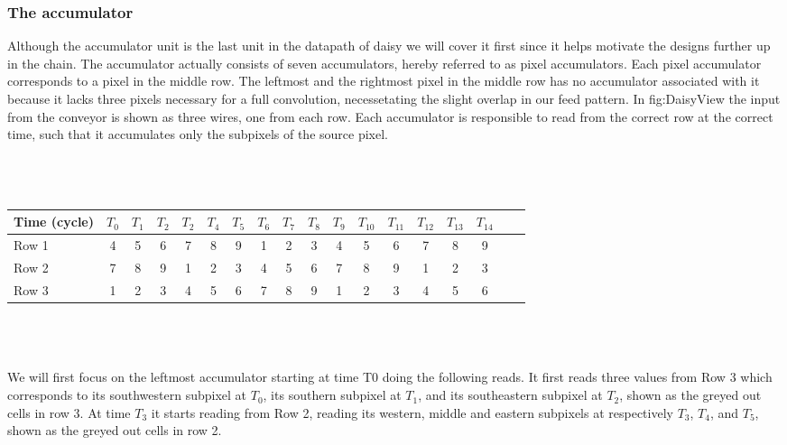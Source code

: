 \subsubsection{The accumulator}
Although the accumulator unit is the last unit in the datapath of daisy we will cover it first since it helps motivate the designs further up in the chain.
The accumulator actually consists of seven accumulators, hereby referred to as pixel accumulators. Each pixel accumulator corresponds to a pixel in the middle row.
The leftmost and the rightmost pixel in the middle row has no accumulator associated with it because it lacks three pixels necessary for a full convolution, necessetating the slight overlap in our feed pattern.
In fig:DaisyView the input from the conveyor is shown as three wires, one from each row.  
Each accumulator is responsible to read from the correct row at the correct time, such that it accumulates only the subpixels of the source pixel.\\ \\ \\
\\
\begin{tabular}{l*{16}{c}r}
    Time (cycle)        & $T_{0}$ & $T_{1}$ & $T_{2}$ & $T_{2}$ & $T_{4}$  & $T_{5}$ & $T_{6}$ & $T_{7}$ & $T_{8}$ & $T_{9}$ & $T_{10}$ & $T_{11}$ & $T_{12}$ & $T_{13}$ & $T_{14}$\\
\hline
Row 1                   & 4 & 5 & 6 & 7 & 8 & 9 & \cellcolor{gray75} 1 & \cellcolor{gray75} 2 & \cellcolor{gray75} 3 & 4 & 5 & 6 & 7 & 8 & 9 & \\
Row 2                   & 7 & 8 & 9 & \cellcolor{gray75} 1 & \cellcolor{gray75} 2 & \cellcolor{gray75} 3 & 4 & 5 & 6 & 7 & 8 & 9 & \cellcolor{gray75} 1 & \cellcolor{gray75} 2 & \cellcolor{gray75} 3 & \\
Row 3                   & \cellcolor{gray75} 1 & \cellcolor{gray75} 2 & \cellcolor{gray75} 3 & 4 & 5 & 6 & 7 & 8 & 9 & \cellcolor{gray75} 1 & \cellcolor{gray75} 2 & \cellcolor{gray75} 3 & 4 & 5 & 6 & \\
\end{tabular}\\ \\ \\
We will first focus on the leftmost accumulator starting at time T0 doing the following reads. 
It first reads three values from Row 3 which corresponds to its southwestern subpixel at $T_{0}$, its southern subpixel at $T_{1}$, and its southeastern subpixel at $T_{2}$, shown as the greyed out cells in row 3.
At time $T_{3}$ it starts reading from Row 2, reading its western, middle and eastern subpixels at respectively $T_{3}$, $T_{4}$, and $T_{5}$, shown as the greyed out cells in row 2.
